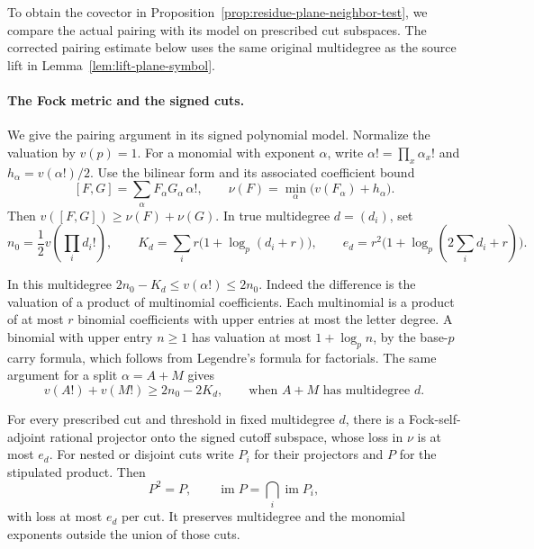 To obtain the covector in Proposition~\ref{prop:residue-plane-neighbor-test},
we compare the actual pairing with its model on prescribed cut
subspaces. The corrected pairing estimate below uses the same original multidegree as the source lift in
Lemma~\ref{lem:lift-plane-symbol}.
\paragraph{The Fock metric and the signed cuts.}
\label{par:plane-gram}
\hypertarget{source-plane-gram}{}
We give the pairing argument in its signed polynomial model.
Normalize the valuation by \(v(p)=1\). For a monomial with
exponent \(\alpha\), write \(\alpha!=\prod_x\alpha_x!\) and
\(h_\alpha=v(\alpha!)/2\). Use the bilinear form and its
associated coefficient bound
\[
  [F,G]=\sum_\alpha F_\alpha G_\alpha\,\alpha!,
  \qquad \nu(F)=\min_\alpha \bigl(v(F_\alpha)+h_\alpha\bigr).
\]
Then \(v([F,G])\ge \nu(F)+\nu(G)\). In true multidegree
\(d=(d_i)\), set
\[
 n_0=\frac12 v\!\left(\prod_i d_i!\right),\qquad
 K_d=\sum_i r\bigl(1+\log_p(d_i+r)\bigr),\qquad
 e_d=r^2\bigl(1+\log_p(2\textstyle\sum_i d_i+r)\bigr).
\]

In this multidegree \(2n_0-K_d\le v(\alpha!)\le2n_0\).
Indeed the difference is the valuation of a product of
multinomial coefficients. Each multinomial is a product of
at most \(r\) binomial coefficients with upper entries at most
the letter degree. A binomial with upper entry \(n\ge1\) has
valuation at most \(1+\log_p n\), by the base-\(p\) carry
formula, which follows from Legendre's formula for factorials.
The same argument for a split \(\alpha=A+M\) gives
\[
   v(A!)+v(M!)\ge 2n_0-2K_d,
   \qquad \text{when \(A+M\) has multidegree \(d\)}.
\]

\begin{lemma}\label{lem:plane-signed-projectors}
For every prescribed cut and threshold in fixed multidegree
\(d\), there is a Fock-self-adjoint rational projector onto
the signed cutoff subspace, whose loss in \(\nu\) is at most
\(e_d\). For nested or disjoint cuts write \(P_i\) for their projectors and \(P\) for the stipulated product. Then
\[
 P^2=P,\qquad \operatorname{im}P=\bigcap_i\operatorname{im}P_i,
\]
with loss at most \(e_d\) per cut.
It preserves multidegree and the monomial exponents outside
the union of those cuts.
\end{lemma}


